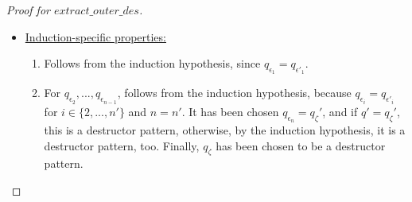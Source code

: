 \documentclass[11pt]{article} %
\begin{document}
\begin{proof}[Proof for $extract\_outer\_des$]
\begin{itemize}
\begin{itemize}
\item \underline{Induction-specific properties:}
\begin{enumerate}
\item Follows from the induction hypothesis, since $q_{\epsilon_1} = q_{\epsilon'_1}$.
\item For $q_{\epsilon_2}, ..., q_{\epsilon_{n-1}}$, follows from the induction hypothesis, because $q_{\epsilon_i} = q_{\epsilon'_i}$ for $i \in \{2, ..., n'\}$ and $n = n'$. It has been chosen $q_{\epsilon_n} = q_\zeta'$, and if $q' = q_\zeta'$, this is a destructor pattern, otherwise, by the induction hypothesis, it is a destructor pattern, too. Finally, $q_\zeta$ has been chosen to be a destructor pattern.
\end{enumerate}

\end{itemize}

\end{itemize}


\end{proof}
\end{document}

